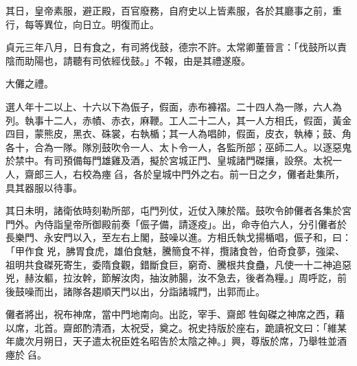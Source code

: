 \begin{pinyinscope}
 其日，皇帝素服，避正殿，百官廢務，自府史以上皆素服，各於其廳事之前，重行，每等異位，向日立。明復而止。



 貞元三年八月，日有食之，有司將伐鼓，德宗不許。太常卿董晉言：「伐鼓所以責陰而助陽也，請聽有司依經伐鼓。」不報，由是其禮遂廢。



 大儺之禮。



 選人年十二以上、十六以下為侲子，假面，赤布褲褶。二十四人為一隊，六人為列。執事十二人，赤幘、赤衣，麻鞭。工人二十二人，其一人方相氏，假面，黃金四目，蒙熊皮，黑衣、硃裳，右執楯；其一人為唱帥，假面，皮衣，執棒；鼓、角各十，合為一隊。隊別鼓吹令一人、太卜令一人，各監所部；巫師二人。以逐惡鬼於禁中。有司預備每門雄雞及酒，擬於宮城正門、皇城諸門磔攘，設祭。太祝一人，齋郎三人，右校為瘞臽，各於皇城中門外之右。前一日之夕，儺者赴集所，具其器服以待事。



 其日未明，諸衛依時刻勒所部，屯門列仗，近仗入陳於階。鼓吹令帥儺者各集於宮門外。內侍詣皇帝所御殿前奏「侲子備，請逐疫」。出，命寺伯六人，分引儺者於長樂門、永安門以入，至左右上閣，鼓噪以進。方相氏執戈揚楯唱，侲子和，曰：「甲作食兇，胇胃食虎，雄伯食魅，騰簡食不祥，攬諸食咎，伯奇食夢，強梁、祖明共食磔死寄生，委隋食觀，錯斷食巨，窮奇、騰根共食蠱，凡使一十二神追惡兇，赫汝軀，拉汝幹，節解汝肉，抽汝肺腸，汝不急去，後者為糧。」周呼訖，前後鼓噪而出，諸隊各趨順天門以出，分詣諸城門，出郭而止。



 儺者將出，祝布神席，當中門地南向。出訖，宰手、齋郎牲匈磔之神席之西，藉以席，北首。齋郎酌清酒，太祝受，奠之。祝史持版於座右，跪讀祝文曰：「維某年歲次月朔日，天子遣太祝臣姓名昭告於太陰之神。」興，尊版於席，乃舉牲並酒瘞於臽。



\end{pinyinscope}